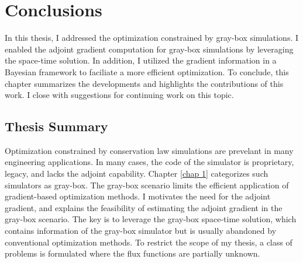\chapter{Conclusions}
\label{chapter 4}
In this thesis, I addressed the optimization constrained by gray-box simulations.
I enabled the adjoint gradient computation for gray-box simulations by leveraging the
space-time solution. In addition, I utilized the gradient information in a Bayesian
framework to faciliate a more efficient optimization. 
To conclude, this chapter summarizes the developments and highlights
the contributions of this work. I close with suggestions for continuing work
on this topic.


\section{Thesis Summary}
Optimization constrained by conservation law simulations are prevelant in many engineering
applications.
In many cases, the code of the simulator is proprietary, legacy, and
lacks the adjoint capability. 
Chapter \ref{chap 1} categorizes such simulators as gray-box.
The gray-box scenario limits the efficient application 
of gradient-based optimization methods.
I motivates the need for the
adjoint gradient, and explains the feasibility
of estimating the adjoint gradient in the gray-box scenario.
The key is to leverage the gray-box space-time solution, which contains information
of the gray-box simulator but is usually abandoned by conventional optimization methods.
To restrict the scope of my thesis, a class of problems is formulated where the
flux functions are partially unknown.\\

